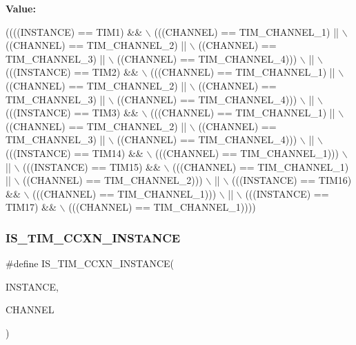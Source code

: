 {\bfseries Value\+:}
\begin{DoxyCode}
((((INSTANCE) == TIM1) &&                   \(\backslash\)
     (((CHANNEL) == TIM\_CHANNEL\_1) ||          \(\backslash\)
      ((CHANNEL) == TIM\_CHANNEL\_2) ||          \(\backslash\)
      ((CHANNEL) == TIM\_CHANNEL\_3) ||          \(\backslash\)
      ((CHANNEL) == TIM\_CHANNEL\_4)))           \(\backslash\)
    ||                                         \(\backslash\)
    (((INSTANCE) == TIM2) &&                   \(\backslash\)
     (((CHANNEL) == TIM\_CHANNEL\_1) ||          \(\backslash\)
      ((CHANNEL) == TIM\_CHANNEL\_2) ||          \(\backslash\)
      ((CHANNEL) == TIM\_CHANNEL\_3) ||          \(\backslash\)
      ((CHANNEL) == TIM\_CHANNEL\_4)))           \(\backslash\)
    ||                                         \(\backslash\)
    (((INSTANCE) == TIM3) &&                   \(\backslash\)
     (((CHANNEL) == TIM\_CHANNEL\_1) ||          \(\backslash\)
      ((CHANNEL) == TIM\_CHANNEL\_2) ||          \(\backslash\)
      ((CHANNEL) == TIM\_CHANNEL\_3) ||          \(\backslash\)
      ((CHANNEL) == TIM\_CHANNEL\_4)))           \(\backslash\)
    ||                                         \(\backslash\)
    (((INSTANCE) == TIM14) &&                  \(\backslash\)
     (((CHANNEL) == TIM\_CHANNEL\_1)))           \(\backslash\)
    ||                                         \(\backslash\)
    (((INSTANCE) == TIM15) &&                  \(\backslash\)
     (((CHANNEL) == TIM\_CHANNEL\_1) ||          \(\backslash\)
      ((CHANNEL) == TIM\_CHANNEL\_2)))           \(\backslash\)
    ||                                         \(\backslash\)
    (((INSTANCE) == TIM16) &&                  \(\backslash\)
     (((CHANNEL) == TIM\_CHANNEL\_1)))           \(\backslash\)
    ||                                         \(\backslash\)
    (((INSTANCE) == TIM17) &&                  \(\backslash\)
     (((CHANNEL) == TIM\_CHANNEL\_1))))
\end{DoxyCode}
\mbox{\label{group___exported__macro_ga7181cfd1649c4e65e24b7c863e94a54f}} 
\subsubsection{\texorpdfstring{I\+S\+\_\+\+T\+I\+M\+\_\+\+C\+C\+X\+N\+\_\+\+I\+N\+S\+T\+A\+N\+CE}{IS\_TIM\_CCXN\_INSTANCE}\hspace{0.1cm}{\footnotesize\ttfamily [1/16]}}
{\footnotesize\ttfamily \#define I\+S\+\_\+\+T\+I\+M\+\_\+\+C\+C\+X\+N\+\_\+\+I\+N\+S\+T\+A\+N\+CE(\begin{DoxyParamCaption}\item[{}]{I\+N\+S\+T\+A\+N\+CE,  }\item[{}]{C\+H\+A\+N\+N\+EL }\end{DoxyParamCaption})}

